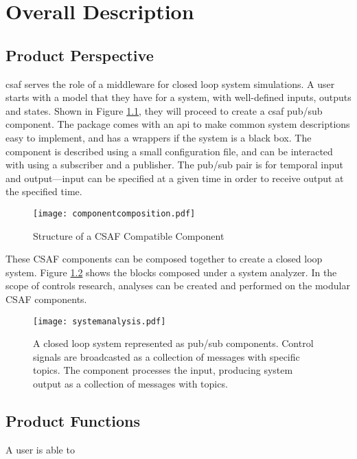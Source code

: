 \chapter{Overall Description}

\section{Product Perspective}

\acrshort{csaf} serves the role of a middleware for closed loop system simulations. A user starts with a model that they have for a system, with well-defined inputs, outputs and states. Shown in Figure \ref{fig:ccomp}, they will proceed to create a \acrshort{csaf} pub/sub component. The package comes with an \acrshort{api} to make common system descriptions easy to implement, and has a wrappers if the system is a black box. 
The component is described using a small configuration file, and can be interacted with using a subscriber and a publisher. The pub/sub pair is for temporal input and output---input can be specified at a given time in order to receive output at the specified time. \\

\begin{figure}
\centering
\texttt{[image: componentcomposition.pdf]}
\caption{Structure of a CSAF Compatible Component}
\label{fig:ccomp}
\end{figure}

These CSAF components can be composed together to create a closed loop system. Figure \ref{fig:csys} shows the blocks composed under a system analyzer. In the scope of controls research, analyses can be created and performed on the modular CSAF components. \\

\begin{figure}
\centering
\texttt{[image: systemanalysis.pdf]}
\caption{A closed loop system represented as pub/sub components. Control signals are broadcasted as a collection of messages with specific topics. The component processes the input, producing system output as a collection of messages with topics. }
\label{fig:csys}
\end{figure}


\section{Product Functions}

A user is able to

